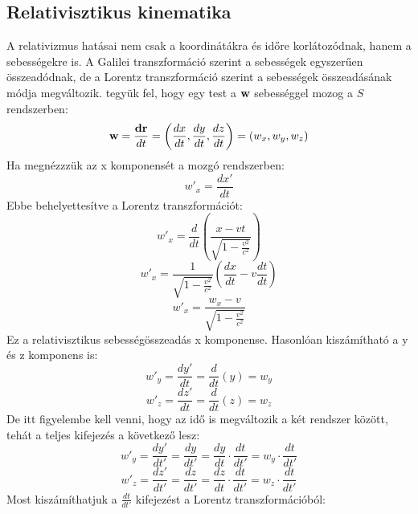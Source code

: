 \documentclass[../main.tex]{subfiles}
\begin{document}
\subsection{Relativisztikus kinematika}
A relativizmus hatásai nem csak a koordinátákra és időre korlátozódnak, hanem a sebességekre is. A Galilei transzformáció szerint a sebességek egyszerűen összeadódnak, de a Lorentz transzformáció szerint a sebességek összeadásának módja megváltozik.
tegyük fel, hogy egy test a $\bold{w}$ sebességgel mozog a $S$ rendszerben:
\begin{equation}
    \bold{w} = \frac{\bold{dr}}{dt} = \left(\frac{dx}{dt}, \frac{dy}{dt}, \frac{dz}{dt}\right) = (w_x, w_y, w_z)
\end{equation}
Ha megnézzzük az x komponensét a mozgó rendszerben:
\begin{equation}
    w'_x = \frac{dx'}{dt}
\end{equation}
Ebbe behelyettesítve a Lorentz transzformációt:
\begin{equation}
    w'_x = \frac{d}{dt} \left(\frac{x - vt}{\sqrt{1 - \frac{v^2}{c^2}}}\right)
\end{equation}
\begin{equation}
    w'_x = \frac{1}{\sqrt{1 - \frac{v^2}{c^2}}} \left(\frac{dx}{dt} - v\frac{dt}{dt}\right)
\end{equation}
\begin{equation}
    w'_x = \frac{w_x - v}{\sqrt{1 - \frac{v^2}{c^2}}}
\end{equation}
Ez a relativisztikus sebességösszeadás x komponense. Hasonlóan kiszámítható a y és z komponens is:
\begin{equation}
    w'_y = \frac{dy'}{dt} = \frac{d}{dt} (y) = w_y
\end{equation}
\begin{equation}
    w'_z = \frac{dz'}{dt} = \frac{d}{dt} (z) = w_z
\end{equation}
De itt figyelembe kell venni, hogy az idő is megváltozik a két rendszer között, tehát a teljes kifejezés a következő lesz:
\begin{equation}
    w'_y = \frac{dy'}{dt'} = \frac{dy}{dt'} = \frac{dy}{dt} \cdot \frac{dt}{dt'} = w_y \cdot \frac{dt}{dt'}
\end{equation}
\begin{equation}
    w'_z = \frac{dz'}{dt'} = \frac{dz}{dt'} = \frac{dz}{dt} \cdot \frac{dt}{dt'} = w_z \cdot \frac{dt}{dt'}
\end{equation}
Most kiszámíthatjuk a $\frac{dt}{dt'}$ kifejezést a Lorentz transzformációból:
\end{document}
